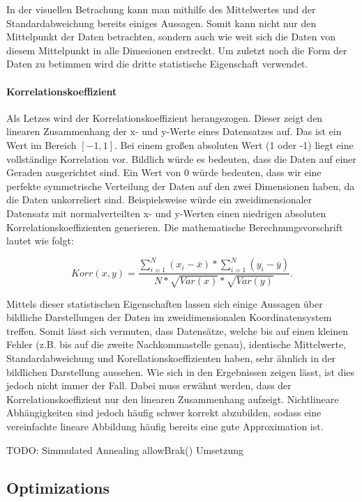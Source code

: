 \documentclass[sigconf]{acmart}
\begin{document}
In der visuellen Betrachung kann man mithilfe des Mittelwertes und der Standardabweichung bereits einiges Aussagen. Somit kann nicht nur den Mittelpunkt der Daten betrachten, sondern auch wie weit sich die Daten von diesem Mittelpunkt in alle Dimesionen erstreckt. Um zuletzt noch die Form der Daten zu betimmen wird die dritte statistische Eigenschaft verwendet.

\paragraph{Korrelationskoeffizient}

Als Letzes wird der Korrelationskoeffizient herangezogen. Dieser zeigt den linearen Zusammenhang der x- und y-Werte eines Datensatzes auf. Das ist ein Wert im Bereich $[-1,1]$. Bei einem großen absoluten Wert (1 oder -1) liegt eine vollständige Korrelation vor. Bildlich würde es bedeuten, dass die Daten auf einer Geraden ausgerichtet sind. Ein Wert von 0 würde bedeuten, dass wir eine perfekte symmetrische Verteilung der Daten auf den zwei Dimensionen haben, da die Daten unkorreliert sind. Beispielsweise würde ein zweidimensionaler Datensatz mit normalverteilten x- und y-Werten einen niedrigen absoluten Korrelationskoeffizienten generieren. Die mathematische Berechnungsvorschrift lautet wie folgt:

$$
Korr(x,y)= \frac{
  \sum_{i=1}^{N}(x_i - \overline{x})* \sum_{i=1}^{N}(y_i - \overline{y})
}{
  N * \sqrt{Var(x)} * \sqrt{Var(y)}
}.
$$

Mittels dieser statistischen Eigenschaften lassen sich einige Aussagen über bildliche Darstellungen der Daten im zweidimensionalen Koordinatensystem treffen. Somit lässt sich vermuten, dass Datensätze, welche bis auf einen kleinen Fehler (z.B. bis auf die zweite Nachkommastelle genau), identische Mittelwerte, Standardabweichung und Korellationskoeffizienten haben, sehr ähnlich in der bildlichen Darstellung aussehen. Wie sich in den Ergebnissen zeigen lässt, ist dies jedoch nicht immer der Fall. Dabei muss erwähnt werden, dass der Korrelationskoeffizient nur den linearen Zusammenhang aufzeigt. Nichtlineare Abhängigkeiten sind jedoch häufig schwer korrekt abzubilden, sodass eine vereinfachte lineare Abbildung häufig bereits eine gute Approximation ist.

TODO: Simmulated Annealing allowBrak() Umsetzung

\subsection{Optimizations}\label{sec:algo:opti}
\end{document}
